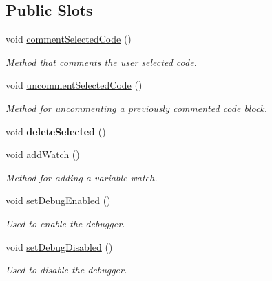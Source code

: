 \subsection*{Public Slots}
\begin{DoxyCompactItemize}
\item 
\hypertarget{class_ru_q_plain_text_edit_aa4304c1935d62a21ca47caefcb4fe73a}{}void \hyperlink{class_ru_q_plain_text_edit_aa4304c1935d62a21ca47caefcb4fe73a}{comment\+Selected\+Code} ()\label{class_ru_q_plain_text_edit_aa4304c1935d62a21ca47caefcb4fe73a}

\begin{DoxyCompactList}\small\item\em Method that comments the user selected code. \end{DoxyCompactList}\item 
\hypertarget{class_ru_q_plain_text_edit_ae4261c2f4317d73e210fb4307291c336}{}void \hyperlink{class_ru_q_plain_text_edit_ae4261c2f4317d73e210fb4307291c336}{uncomment\+Selected\+Code} ()\label{class_ru_q_plain_text_edit_ae4261c2f4317d73e210fb4307291c336}

\begin{DoxyCompactList}\small\item\em Method for uncommenting a previously commented code block. \end{DoxyCompactList}\item 
\hypertarget{class_ru_q_plain_text_edit_a2b37f59c4986e846036b5626fc635e84}{}void {\bfseries delete\+Selected} ()\label{class_ru_q_plain_text_edit_a2b37f59c4986e846036b5626fc635e84}

\item 
\hypertarget{class_ru_q_plain_text_edit_abe44143e74b70e76b7c098378cdce21f}{}void \hyperlink{class_ru_q_plain_text_edit_abe44143e74b70e76b7c098378cdce21f}{add\+Watch} ()\label{class_ru_q_plain_text_edit_abe44143e74b70e76b7c098378cdce21f}

\begin{DoxyCompactList}\small\item\em Method for adding a variable watch. \end{DoxyCompactList}\item 
\hypertarget{class_ru_q_plain_text_edit_a4c8f22184407d5d9cd402e9e19a77dfa}{}void \hyperlink{class_ru_q_plain_text_edit_a4c8f22184407d5d9cd402e9e19a77dfa}{set\+Debug\+Enabled} ()\label{class_ru_q_plain_text_edit_a4c8f22184407d5d9cd402e9e19a77dfa}

\begin{DoxyCompactList}\small\item\em Used to enable the debugger. \end{DoxyCompactList}\item 
\hypertarget{class_ru_q_plain_text_edit_a941b8becef86d6c5a9378843d084e67a}{}void \hyperlink{class_ru_q_plain_text_edit_a941b8becef86d6c5a9378843d084e67a}{set\+Debug\+Disabled} ()\label{class_ru_q_plain_text_edit_a941b8becef86d6c5a9378843d084e67a}

\begin{DoxyCompactList}\small\item\em Used to disable the debugger. \end{DoxyCompactList}\end{DoxyCompactItemize}
